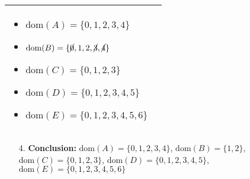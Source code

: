 \begin{example}
\begin{center}
\begin{tabular}{ll}
{\begin{itemize}
                \item $\text{dom}(A) = \{0, 1, 2, 3, 4\}$
                \item $\text{dom}(B) = \{\cancel{0}, 1, 2, \cancel{3}, \cancel{4}\} $
                \item $\text{dom}(C) = \{0, 1, 2, 3\} $
                \item $\text{dom}(D) = \{0, 1, 2, 3, 4, 5\} $
                \item $\text{dom}(E) = \{0, 1, 2, 3, 4, 5, 6\} $
            \end{itemize}} \\
            \bottomrule
        \end{tabular}
    \end{center}
    \vspace{1em}

    \begin{enumerate}
        \item[4. ] \textbf{Conclusion:} $\text{dom}(A) = \{0, 1, 2, 3, 4\}$, $\text{dom}(B) = \{1, 2\} $, $\text{dom}(C) = \{0, 1, 2, 3\} $, $\text{dom}(D) = \{0, 1, 2, 3, 4, 5\} $, $\text{dom}(E) = \{0, 1, 2, 3, 4, 5, 6\} $
    \end{enumerate}
\end{example}

